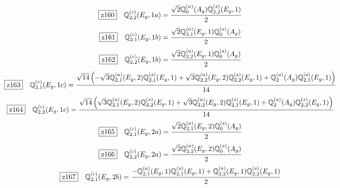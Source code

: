 \documentclass[fleqn,10pt,landscape]{jsarticle}
\begin{document}
\begin{dmath*}
\hspace*{3mm}\fbox{z160}\quad \mathbb{Q}_{2,2}^{(c)}(E_{g},1a)=\frac{\sqrt{2} \mathbb{Q}_{0}^{(a)}(A_{g}) \mathbb{Q}_{2,2}^{(s)}(E_{g},1)}{2}
\end{dmath*}
\begin{dmath*}
\hspace*{3mm}\fbox{z161}\quad \mathbb{Q}_{2,1}^{(c)}(E_{g},1b)=\frac{\sqrt{2} \mathbb{Q}_{2,1}^{(a)}(E_{g},1) \mathbb{Q}_{0}^{(s)}(A_{g})}{2}
\end{dmath*}
\begin{dmath*}
\hspace*{3mm}\fbox{z162}\quad \mathbb{Q}_{2,2}^{(c)}(E_{g},1b)=\frac{\sqrt{2} \mathbb{Q}_{2,2}^{(a)}(E_{g},1) \mathbb{Q}_{0}^{(s)}(A_{g})}{2}
\end{dmath*}
\begin{dmath*}
\hspace*{3mm}\fbox{z163}\quad \mathbb{Q}_{2,1}^{(c)}(E_{g},1c)=\frac{\sqrt{14} \left(- \sqrt{3} \mathbb{Q}_{2,1}^{(a)}(E_{g},2) \mathbb{Q}_{2,1}^{(s)}(E_{g},1) + \sqrt{3} \mathbb{Q}_{2,2}^{(a)}(E_{g},2) \mathbb{Q}_{2,2}^{(s)}(E_{g},1) + \mathbb{Q}_{2}^{(a)}(A_{g}) \mathbb{Q}_{2,1}^{(s)}(E_{g},1)\right)}{14}
\end{dmath*}
\begin{dmath*}
\hspace*{3mm}\fbox{z164}\quad \mathbb{Q}_{2,2}^{(c)}(E_{g},1c)=\frac{\sqrt{14} \left(\sqrt{3} \mathbb{Q}_{2,1}^{(a)}(E_{g},2) \mathbb{Q}_{2,2}^{(s)}(E_{g},1) + \sqrt{3} \mathbb{Q}_{2,2}^{(a)}(E_{g},2) \mathbb{Q}_{2,1}^{(s)}(E_{g},1) + \mathbb{Q}_{2}^{(a)}(A_{g}) \mathbb{Q}_{2,2}^{(s)}(E_{g},1)\right)}{14}
\end{dmath*}
\begin{dmath*}
\hspace*{3mm}\fbox{z165}\quad \mathbb{Q}_{2,1}^{(c)}(E_{g},2a)=\frac{\sqrt{2} \mathbb{Q}_{2,1}^{(a)}(E_{g},2) \mathbb{Q}_{0}^{(s)}(A_{g})}{2}
\end{dmath*}
\begin{dmath*}
\hspace*{3mm}\fbox{z166}\quad \mathbb{Q}_{2,2}^{(c)}(E_{g},2a)=\frac{\sqrt{2} \mathbb{Q}_{2,2}^{(a)}(E_{g},2) \mathbb{Q}_{0}^{(s)}(A_{g})}{2}
\end{dmath*}
\begin{dmath*}
\hspace*{3mm}\fbox{z167}\quad \mathbb{Q}_{2,1}^{(c)}(E_{g},2b)=\frac{- \mathbb{Q}_{2,1}^{(a)}(E_{g},1) \mathbb{Q}_{2,1}^{(s)}(E_{g},1) + \mathbb{Q}_{2,2}^{(a)}(E_{g},1) \mathbb{Q}_{2,2}^{(s)}(E_{g},1)}{2}
\end{dmath*}
\end{document}

